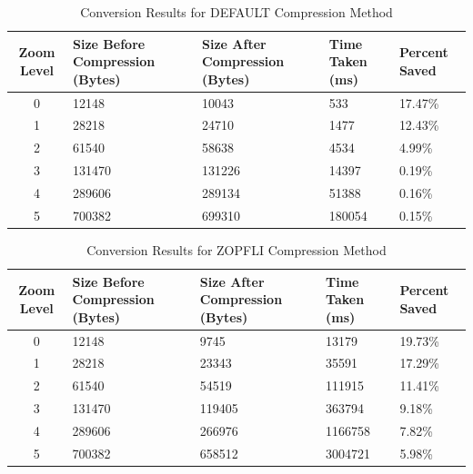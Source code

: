 \begin{table}[h]
    \centering
    \begin{tabularx}{\textwidth}{|c|X|X|X|X|}
        \hline
        \textbf{Zoom Level} & \textbf{Size Before Compression (Bytes)} & \textbf{Size After Compression (Bytes)} & \textbf{Time Taken (ms)} & \textbf{Percent Saved} \\ \hline
        0 & 12148 & 10043 & 533 & 17.47\% \\ \hline
        1 & 28218 & 24710 & 1477 & 12.43\% \\ \hline
        2 & 61540 & 58638 & 4534 & 4.99\% \\ \hline
        3 & 131470 & 131226 & 14397 & 0.19\% \\ \hline
        4 & 289606 & 289134 & 51388 & 0.16\% \\ \hline
        5 & 700382 & 699310 & 180054 & 0.15\% \\ \hline
    \end{tabularx}
    \caption{Conversion Results for DEFAULT Compression Method}
    \label{tab:compression_default}
\end{table}

\begin{table}[h]
    \centering
    \begin{tabularx}{\textwidth}{|c|X|X|X|X|}
        \hline
        \textbf{Zoom Level} & \textbf{Size Before Compression (Bytes)} & \textbf{Size After Compression (Bytes)} & \textbf{Time Taken (ms)} & \textbf{Percent Saved} \\ \hline
        0 & 12148 & 9745 & 13179 & 19.73\% \\ \hline
        1 & 28218 & 23343 & 35591 & 17.29\% \\ \hline
        2 & 61540 & 54519 & 111915 & 11.41\% \\ \hline
        3 & 131470 & 119405 & 363794 & 9.18\% \\ \hline
        4 & 289606 & 266976 & 1166758 & 7.82\% \\ \hline
        5 & 700382 & 658512 & 3004721 & 5.98\% \\ \hline
    \end{tabularx}
    \caption{Conversion Results for ZOPFLI Compression Method}
    \label{tab:compression_zopfli}
\end{table}

